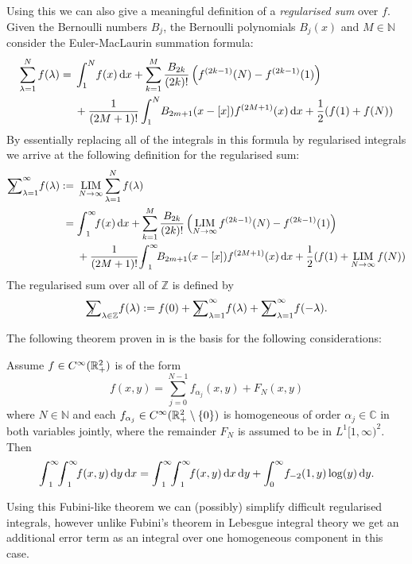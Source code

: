 Using this we can also give a meaningful definition of a \emph{regularised sum}
over $f$. Given the Bernoulli numbers $B_j$, the Bernoulli polynomials
$B_j(x)$ and $M\in\mathbb{N}$ consider the Euler-MacLaurin summation formula:
\begin{equation}
  \label{eqn:euler-maclaurin}
  \begin{split}
    \sum_{\lambda=1}^N f(\lambda) = {} & \Integ[N]{1}{x}{f(x)}
    + \sum_{k=1}^M \frac{B_{2k}}{(2k)!}\left(f^{(2k-1)}(N) - f^{(2k-1)}(1)\right)
    \\
    &+ \frac1{(2M + 1)!}\Integ[N]{1}{x}{B_{2m+1}(x-[x])f^{(2M+1)}(x)}
    + \frac12(f(1)+f(N))
  \end{split}
\end{equation}
By essentially replacing all of the integrals in this formula by regularised
integrals we arrive at the following definition for the regularised sum:
\begin{align*}
  \Regsum_{\lambda=1}^\infty f(\lambda) := {}& \Reglim_{N\to\infty}
  \sum_{\lambda=1}^N f(\lambda) \\
  = {} & \Regint{x}{f(x)} + \sum_{k=1}^M \frac{B_{2k}}{(2k)!}\left(
  \Reglim_{N\to\infty} f^{(2k-1)}(N) - f^{(2k-1)}(1)\right) \\
  &+ \frac1{(2M + 1)!}\Regint{x}{B_{2m+1}(x - [x])f^{(2M+1)}(x)}
   + \frac12(f(1) + \Reglim_{N\to\infty} f(N))
\end{align*}
The regularised sum over all of $\mathbb{Z}$ is defined by
\begin{equation*}
  \Regsum_{\lambda\in\mathbb{Z}} f(\lambda) := f(0) + \Regsum_{\lambda=1}^\infty
  f(\lambda) + \Regsum_{\lambda=1}^\infty f(-\lambda).
\end{equation*}

The following theorem proven in \cite{LV13} is the basis for the following
considerations:
\begin{Theorem}
  \label{thm:fubini}
  Assume $f\in\Cinf(\Rplus[2])$ is of the form
  \begin{equation*}
    f(x,y) = \sum_{j=0}^{N-1} f_{\alpha_j}(x,y) + F_N(x,y)
  \end{equation*}
  where $N\in\mathbb{N}$ and each $f_{\alpha_j}\in\Cinf(\mathbb{R}_+^2\setminus\{0\})$
  is homogeneous of order $\alpha_j\in\mathbb{C}$ in both variables jointly,
  where the remainder $F_N$ is assumed to be in $L^1[1,\infty)^2$. Then
  \begin{equation*}
    \Regint{x}{\Regint{y}{f(x,y)}} =
    \Regint{y}{\Regint{x}{f(x,y)}} + \Integ[\infty]{0}{y}{f_{-2}(1,y)\log(y)}.
  \end{equation*}
\end{Theorem}
Using this Fubini-like theorem we can (possibly) simplify difficult regularised
integrals, however unlike Fubini's theorem in Lebesgue integral theory we get an
additional error term as an integral over one homogeneous component in this
case.


